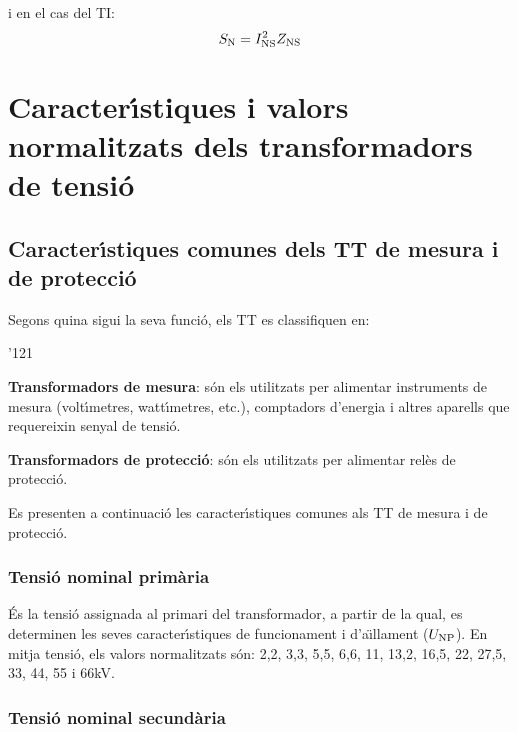 i en el cas del TI:
\begin{equation}\label{eq:sn_ti}
    S_\mathrm{N} = I_\mathrm{NS}^2 Z_\mathrm{NS}
\end{equation}


\section{Caracter\'{\i}stiques i valors normalitzats dels transformadors de tensi\'{o}}

\subsection{Caracter\'{\i}stiques comunes dels TT de mesura i de protecci\'{o}}

Segons quina sigui la seva funci\'{o}, els TT es classifiquen en:
\begin{dinglist}{'121}
   \item \textbf{Transformadors de mesura}: s\'{o}n els utilitzats per alimentar
            instruments de mesura (volt\'{\i}metres, watt\'{\i}metres, etc.),
            comptadors d'energia i altres aparells que requereixin senyal de tensi\'{o}.
   \item \textbf{Transformadors de protecci\'{o}}: s\'{o}n els utilitzats per
   alimentar rel\`{e}s de protecci\'{o}.
\end{dinglist}

Es presenten a continuaci\'{o} les caracter\'{\i}stiques comunes als TT de
mesura i de protecci\'{o}.

\subsubsection{Tensi\'{o} nominal prim\`{a}ria}

\'{E}s la tensi\'{o} assignada al primari del transformador, a partir de la
qual, es determinen les seves caracter\'{\i}stiques de funcionament i
d'a\"{\i}llament ($U_\mathrm{NP}$). En mitja tensi\'{o}, els valors normalitzats
s\'{o}n: 2,2, 3,3, 5,5, 6,6, 11, 13,2, 16,5, 22, 27,5, 33, 44, 55 i
66\unit{kV}.

\subsubsection{Tensi\'{o} nominal secund\`{a}ria}

